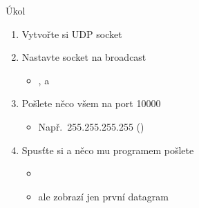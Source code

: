 \begin{frame}{Úkol}

  \begin{enumerate}
    \item Vytvořte si UDP socket
    \item Nastavte socket na broadcast
    \begin{itemize}
      \item {},  a 
    \end{itemize}

    \item Pošlete něco všem na port 10000
    \begin{itemize}
      \item Např.\ 255.255.255.255 ()
    \end{itemize}

    \item Spusťte si  a něco mu programem pošlete
    \begin{itemize}
      \item {}
      \item {} ale zobrazí jen první datagram
    \end{itemize}
  \end{enumerate}

\end{frame}

